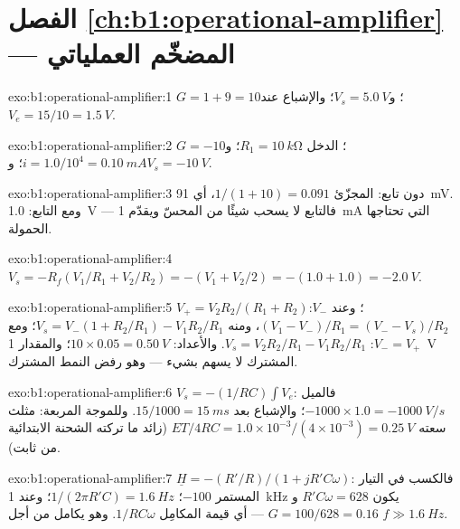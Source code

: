 \section*{الفصل \ref{ch:b1:operational-amplifier} --- المضخّم العملياتي}

\begin{solution}{exo:b1:operational-amplifier:1}
$G = 1 + 9 = 10$؛ و$V_s = \qty{5.0}{V}$؛ والإشباع عند $V_e = 15/10 =
\qty{1.5}{V}$.
\end{solution}

\begin{solution}{exo:b1:operational-amplifier:2}
$G = -10$؛  الدخل $R_1 = \qty{10}{k\ohm}$؛ و$i = 1.0/10^4 =
\qty{0.10}{mA}$؛ و$V_s = \qty{-10}{V}$.
\end{solution}

\begin{solution}{exo:b1:operational-amplifier:3}
دون تابع: المجزّئ $1/(1 + 10) = 0.091$، أي \qty{91}{mV}. ومع التابع:
\qty{1.0}{V} --- فالتابع لا يسحب شيئًا من المحسّ ويقدّم
\qty{1}{mA} التي تحتاجها الحمولة.
\end{solution}

\begin{solution}{exo:b1:operational-amplifier:4}
$V_s = -R_f(V_1/R_1 + V_2/R_2) = -(V_1 + V_2/2) = -(1.0 + 1.0) = \qty{-2.0}{V}$.
\end{solution}

\begin{solution}{exo:b1:operational-amplifier:5}
$V_+ = V_2R_2/(R_1 + R_2)$؛ وعند $V_-$: $(V_1 - V_-)/R_1 = (V_- - V_s)/R_2$،
ومنه $V_s = V_-(1 + R_2/R_1) - V_1R_2/R_1$؛ ومع $V_- = V_+$:
$V_s = V_2R_2/R_1 - V_1R_2/R_1$. والأعداد: $10 \times 0.05 = \qty{0.50}{V}$؛
والمقدار \qty{1}{V} المشترك لا يسهم بشيء --- وهو رفض النمط المشترك.
\end{solution}

\begin{solution}{exo:b1:operational-amplifier:6}
$V_s = -(1/RC)\int V_e$: فالميل $-1000 \times 1.0 = \qty{-1000}{V/s}$؛
والإشباع بعد $15/1000 = \qty{15}{ms}$. وللموجة المربعة: مثلث سعته
$ET/4RC = 1.0 \times 10^{-3}/(4 \times 10^{-3}) = \qty{0.25}{V}$
(زائد ما تركته الشحنة الابتدائية من ثابت).
\end{solution}

\begin{solution}{exo:b1:operational-amplifier:7}
$\underline H = -(R'/R)/(1 + jR'C\omega)$: فالكسب في التيار المستمر $-100$؛ 
$1/(2\pi R'C) = \qty{1.6}{Hz}$؛ وعند \qty{1}{kHz} يكون $R'C\omega = 628$ و $G =
100/628 = 0.16$ --- أي قيمة المكامِل $1/RC\omega$. وهو يكامل من أجل
$f \gg \qty{1.6}{Hz}$.
\end{solution}

